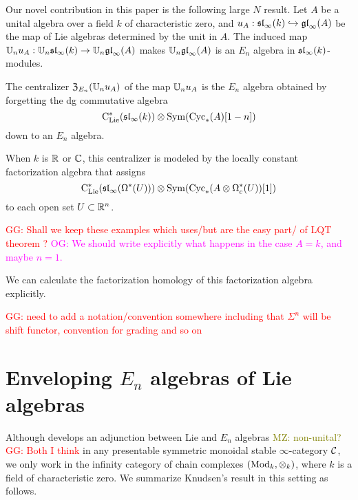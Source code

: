 \documentclass[11pt]{amsart}
\numberwithin{equation}{section}
\def\owen{\textcolor{magenta}{OG: }\textcolor{magenta}}
\def\mahmoud{\textcolor{olive}{MZ: }\textcolor{olive}}
\def\greg{\textcolor{red}{GG: }\textcolor{red}}
\begin{document}
Our novel contribution in this paper is the following large $N$ result. Let $A$ be a unital algebra over a field $k$ of characteristic zero, 
and $u_A: \sl_\infty(k) \hookrightarrow \gl_\infty(A)$ be the map of Lie algebras determined by the unit in $A$. 
The induced map $\UU_nu_A: \UU_n\sl_\infty(k) \to \UU_n\gl_\infty(A)$ makes $\UU_n\gl_\infty(A)$ is an $E_n$ algebra in $\sl_\infty(k)$-modules.

\begin{thm}
\label{thm: large N}

The centralizer ${\frak Z}_{E_n}(\UU_nu_A)$ of the map $\UU_nu_A$ is the $E_n$ algebra obtained by forgetting the dg commutative algebra
\[
\clies(\sl_\infty(k)) \otimes \Sym(\Cyc_*(A)[1-n])
\]
down to an $E_n$ algebra.

When $k$ is $\RR$ or $\CC$, this centralizer is modeled by the locally constant factorization algebra that assigns
\[
\clies(\sl_\infty(\Omega^*(U)))\otimes \Sym(\Cyc_*(A \otimes \Omega^*_c(U))[1])
\]
to each open set $U \subset \RR^n$.
\end{thm}
\greg{Shall we keep these examples which uses/but are the easy part/ of LQT theorem ?}
\owen{We should write explicitly what happens in the case $A = k$, and maybe $n=1$.}

We can calculate the factorization homology of this factorization algebra explicitly.

\greg{need to add a notation/convention somewhere including that $\Sigma^n$ will be shift functor, convention for grading and so on}
\section{Enveloping $E_n$ algebras of Lie algebras}

Although \cite{Knudsen} develops an adjunction between Lie and $E_n$ algebras \mahmoud{non-unital?}\greg{Both I think}
in any presentable symmetric monoidal stable $\infty$-category $\cC$,
we only work in the infinity category of chain complexes $(\Mod_k, \otimes_k)$, where $k$ is a field of characteristic zero.
We summarize Knudsen's result in this setting as follows.
\end{document}
